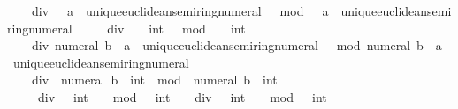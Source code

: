 \begin{isabellebody}
\ \ \ {\isachardoublequoteopen}{}\ div\ {}\ {\isacharcolon}{\kern0pt}{\isacharcolon}{\kern0pt}\ {\isacharprime}{\kern0pt}a\ {\isacharcolon}{\kern0pt}{\isacharcolon}{\kern0pt}\ unique{\isacharunderscore}{\kern0pt}euclidean{\isacharunderscore}{\kern0pt}semiring{\isacharunderscore}{\kern0pt}numeral{\isachardoublequoteclose}\ {\isacharbar}{\kern0pt}\ {\isachardoublequoteopen}{}\ mod\ {}\ {\isacharcolon}{\kern0pt}{\isacharcolon}{\kern0pt}\ {\isacharprime}{\kern0pt}a\ {\isacharcolon}{\kern0pt}{\isacharcolon}{\kern0pt}\ unique{\isacharunderscore}{\kern0pt}euclidean{\isacharunderscore}{\kern0pt}semiring{\isacharunderscore}{\kern0pt}numeral{\isachardoublequoteclose}\ {\isacharbar}{\kern0pt}\isanewline
\ \ \ {\isachardoublequoteopen}{}\ div\ {\isacharminus}{\kern0pt}\ {}\ {\isacharcolon}{\kern0pt}{\isacharcolon}{\kern0pt}\ int{\isachardoublequoteclose}\ {\isacharbar}{\kern0pt}\ {\isachardoublequoteopen}{}\ mod\ {\isacharminus}{\kern0pt}\ {}\ {\isacharcolon}{\kern0pt}{\isacharcolon}{\kern0pt}\ int{\isachardoublequoteclose}\ {\isacharbar}{\kern0pt}\isanewline
\ \ \ {\isachardoublequoteopen}{}\ div\ numeral\ b\ {\isacharcolon}{\kern0pt}{\isacharcolon}{\kern0pt}\ {\isacharprime}{\kern0pt}a\ {\isacharcolon}{\kern0pt}{\isacharcolon}{\kern0pt}\ unique{\isacharunderscore}{\kern0pt}euclidean{\isacharunderscore}{\kern0pt}semiring{\isacharunderscore}{\kern0pt}numeral{\isachardoublequoteclose}\ {\isacharbar}{\kern0pt}\ {\isachardoublequoteopen}{}\ mod\ numeral\ b\ {\isacharcolon}{\kern0pt}{\isacharcolon}{\kern0pt}\ {\isacharprime}{\kern0pt}a\ {\isacharcolon}{\kern0pt}{\isacharcolon}{\kern0pt}\ unique{\isacharunderscore}{\kern0pt}euclidean{\isacharunderscore}{\kern0pt}semiring{\isacharunderscore}{\kern0pt}numeral{\isachardoublequoteclose}\ {\isacharbar}{\kern0pt}\isanewline
\ \ \ {\isachardoublequoteopen}{}\ div\ {\isacharminus}{\kern0pt}\ numeral\ b\ {\isacharcolon}{\kern0pt}{\isacharcolon}{\kern0pt}\ int{\isachardoublequoteclose}\ {\isacharbar}{\kern0pt}{\isachardoublequoteopen}{}\ mod\ {\isacharminus}{\kern0pt}\ numeral\ b\ {\isacharcolon}{\kern0pt}{\isacharcolon}{\kern0pt}\ int{\isachardoublequoteclose}\ {\isacharbar}{\kern0pt}\isanewline
\ \ \ {\isachardoublequoteopen}{\isacharminus}{\kern0pt}\ {}\ div\ {}\ {\isacharcolon}{\kern0pt}{\isacharcolon}{\kern0pt}\ int{\isachardoublequoteclose}\ {\isacharbar}{\kern0pt}\ {\isachardoublequoteopen}{\isacharminus}{\kern0pt}\ {}\ mod\ {}\ {\isacharcolon}{\kern0pt}{\isacharcolon}{\kern0pt}\ int{\isachardoublequoteclose}\ {\isacharbar}{\kern0pt}\ {\isachardoublequoteopen}{\isacharminus}{\kern0pt}\ {}\ div\ {}\ {\isacharcolon}{\kern0pt}{\isacharcolon}{\kern0pt}\ int{\isachardoublequoteclose}\ {\isacharbar}{\kern0pt}\ {\isachardoublequoteopen}{\isacharminus}{\kern0pt}\ {}\ mod\ {}\ {\isacharcolon}{\kern0pt}{\isacharcolon}{\kern0pt}\ int{\isachardoublequoteclose}\ {\isacharbar}{\kern0pt}\isanewline

\end{isabellebody}
